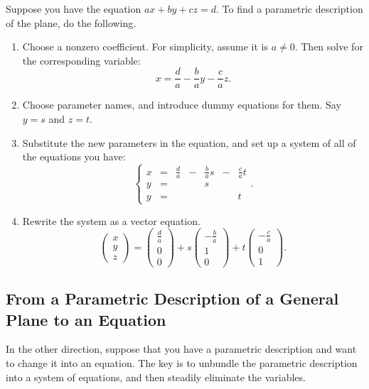 \documentclass[00-livre-main.tex]{subfiles}
\begin{document}
Suppose you have the equation $ax+by+cz = d$. To find a parametric description of the plane, do the following.
\begin{enumerate}
\item Choose a nonzero coefficient. For simplicity, assume it is $a\neq 0$. Then solve 
for the corresponding variable:
\[
x  = \frac{d}{a} - \frac{b}{a} y - \frac{c}{a} z.
\]

\item Choose parameter names, and introduce dummy equations for them. Say $y=s$ and $z=t$.

\item Substitute the new parameters in the equation, and set up a system of all of the equations you have:
\[
\left\{ \begin{array}{rrrrrrr}
x  &=& \frac{d}{a} &-& \frac{b}{a} s &-& \frac{c}{a} t \\
y  &=&             & &             s & &  \\
y  &=&             & &               & & t 
\end{array}\right. .
\]

\item Rewrite the system as a vector equation.
\[
\begin{pmatrix} x \\ y \\ z \end{pmatrix} = 
\begin{pmatrix} \frac{d}{a} \\ 0 \\ 0 \end{pmatrix} + 
s\begin{pmatrix} -\frac{b}{a} \\ 1 \\ 0 \end{pmatrix} +
t\begin{pmatrix} -\frac{c}{a} \\ 0 \\ 1 \end{pmatrix} .
\]
\end{enumerate}

\subsection*{From a Parametric Description of a General Plane to an Equation}

In the other direction, suppose that you have a parametric description and want to change it into an equation. The key is to unbundle the parametric description into a system of equations, and then steadily eliminate the variables.
\end{document}
